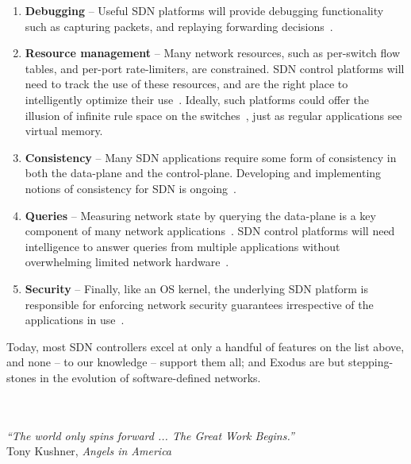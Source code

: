 \begin{enumerate}
\item {\bf Debugging} -- Useful SDN platforms will provide debugging functionality such as
capturing packets, and replaying forwarding decisions~\cite{packet_history, ofrewind}.
\item {\bf Resource management} -- Many network resources, such as per-switch flow tables,
and per-port rate-limiters, are constrained. SDN control platforms will need to track the use of these
resources, and are the right place to intelligently optimize their use~\cite{Curtis:2011devoflow,Yu:2010,Kang:2013optimizing,Kanizo:2013palette}. Ideally, such platforms
could offer the illusion of infinite rule space on the switches~\cite{cacheflow}, just as regular applications see
virtual memory.
\item {\bf Consistency} -- Many SDN applications require some form of consistency in both the
data-plane and the control-plane. Developing and implementing notions of consistency for
SDN is ongoing~\cite{reitblatt12consistent,Mahajan2013,of.cpp,sdn-transactions}.
\item {\bf Queries} -- Measuring network state by querying the data-plane is a key component of
many network applications~\cite{alfares10hedera,jain++:sigcomm13-google-sdn,elastictree,Benson2011microte}. SDN control platforms will need intelligence to answer
queries from multiple applications without overwhelming limited network hardware~\cite{Rotsos:2012oflops}.
\item{\bf Security} -- Finally, like an OS kernel, the underlying SDN platform is responsible for enforcing
network security guarantees irrespective of the applications in use~\cite{FRESCO,FortNox}.
\end{enumerate}

Today, most SDN controllers excel at only a handful of features on the list above, and none -- to our knowledge --
support them all; \sys and Exodus are but stepping-stones in the evolution of software-defined networks.

\ \\
\ \\
{\raggedleft{}
\emph{``The world only spins forward ... The Great Work Begins.''}\\
\hfill Tony Kushner, \emph{Angels in America}
}



